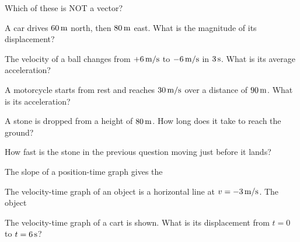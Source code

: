 \begin{exo}{}
Which of these is NOT a vector?
\end{exo}
\begin{exo}{}
A car drives $60\,\mathrm{m}$ north, then $80\,\mathrm{m}$ east. What is the magnitude of its displacement?
\choices{$140\m$}{$20\m$}{$100\m$}{$70\m$}
\end{exo}
\begin{exo}{}
The velocity of a ball changes from $+6\,\mathrm{m/s}$ to $-6\,\mathrm{m/s}$ in $3\,\mathrm{s}$. What is its average acceleration?
\end{exo}
\begin{exo}{}
A motorcycle starts from rest and reaches $30\,\mathrm{m/s}$ over a distance of $90\,\mathrm{m}$. What is its acceleration?
\choices{$5\mss$}{$10\mss$}{$2.5\mss$}{$0.33\mss$}
\end{exo}
\begin{exo}{}
A stone is dropped from a height of $80\,\mathrm{m}$. How long does it take to reach the ground?
\choices{$8\s$}{$2\s$}{$4\s$}{$16\s$}
\end{exo}
\begin{exo}{}
How fast is the stone in the previous question moving just before it lands?
\choices{$80\ms$}{$20\ms$}{$16\ms$}{$40\ms$}
\end{exo}
\begin{exo}{}
The slope of a position-time graph gives the
\end{exo}
\begin{exo}{}
The velocity-time graph of an object is a horizontal line at $v=-3\,\mathrm{m/s}$. The object
\end{exo}
\begin{exo}{}
The velocity-time graph of a cart is shown. What is its displacement from $t=0$ to $t=6\,\mathrm{s}$?
\gVt
\choices{$18\m$}{$24\m$}{$36\m$}{$30\m$}
\end{exo}
